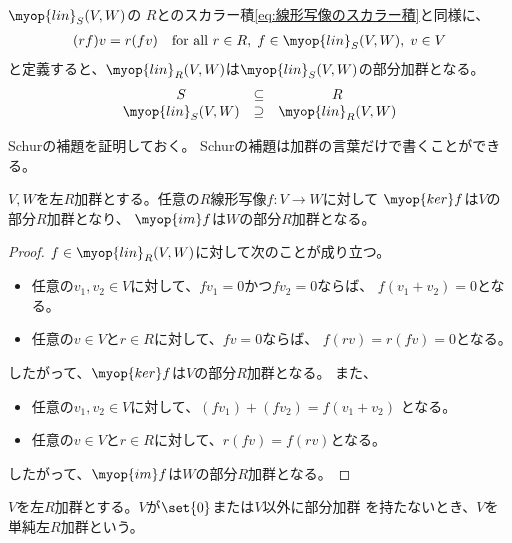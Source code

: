 	$\myop{lin}_S(V,W)$の
	$R$とのスカラー積\eqref{eq:線形写像のスカラー積}と同様に、
	\begin{equation*}\begin{split} %
		(rf)v = r(fv)
		\quad\text{for all }r\in R,\;f\in \myop{lin}_S(V,W),\;v\in V
	\end{split}\end{equation*} %
	と定義すると、$\myop{lin}_R(V,W)$は$\myop{lin}_S(V,W)$の部分加群となる。
	\begin{equation*}\begin{matrix} %
		S &\subseteq& R \\
		\myop{lin}_S(V,W) &\supseteq& \myop{lin}_R(V,W) \\
	\end{matrix}\end{equation*} %

	Schurの補題を証明しておく。
	Schurの補題は加群の言葉だけで書くことができる。

	\begin{proposition}[線形写像の核と像]\label{prop:線形写像の核と像} %
		$V,W$を左$R$加群とする。任意の$R$線形写像$f:V\to W$に対して
		$\myop{ker}f$は$V$の部分$R$加群となり、
		$\myop{im}f$は$W$の部分$R$加群となる。
	\end{proposition} %
	\begin{proof} %
		$f\in \myop{lin}_R(V,W)$に対して次のことが成り立つ。
		\begin{itemize}\setlength{\itemsep}{-1mm} %
			\item 任意の$v_1,v_2\in V$に対して、$fv_1=0$かつ$fv_2=0$ならば、
			$f(v_1+v_2)=0$となる。
			\item 任意の$v\in V$と$r\in R$に対して、$fv=0$ならば、
			$f(rv)=r(fv)=0$となる。
		\end{itemize} %
		したがって、$\myop{ker}f$は$V$の部分$R$加群となる。
		また、
		\begin{itemize}\setlength{\itemsep}{-1mm} %
			\item 任意の$v_1,v_2\in V$に対して、$(fv_1)+(fv_2)=f(v_1+v_2)$
			となる。
			\item 任意の$v\in V$と$r\in R$に対して、$r(fv)=f(rv)$となる。
		\end{itemize} %
		したがって、$\myop{im}f$は$W$の部分$R$加群となる。
	\end{proof} %

	\begin{definition}[単純加群]\label{def:単純加群} %
		$V$を左$R$加群とする。$V$が$\set{0}$または$V$以外に部分加群
		を持たないとき、$V$を単純左$R$加群という。
	\end{definition} %


